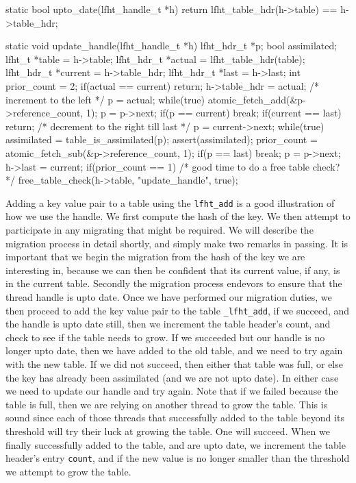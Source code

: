 \begin{center}
\begin{clisting}
static bool upto_date(lfht_handle_t *h){
  return lfht_table_hdr(h->table) == h->table_hdr;
}

static void update_handle(lfht_handle_t *h){
  lfht_hdr_t *p;
  bool assimilated;
  lfht_t *table = h->table;
  lfht_hdr_t *actual = lfht_table_hdr(table);
  lfht_hdr_t *current  = h->table_hdr;
  lfht_hdr_t *last = h->last;
  int prior_count = 2;
  if(actual == current){
    return;
  }
  h->table_hdr = actual;
  /* increment to the left */
  p = actual;
  while(true){
    atomic_fetch_add(&p->reference_count, 1);
    p = p->next;
    if(p == current){ break; }
  }
  if(current == last){  return; }
  /* decrement to the right till last */
  p = current->next;
  while(true){
    assimilated = table_is_assimilated(p);
    assert(assimilated);
    prior_count = atomic_fetch_sub(&p->reference_count, 1);
    if(p == last){ break; }
    p = p->next;
  }
  h->last = current;
  if(prior_count == 1){
    /* good time to do a free table check? */
    free_table_check(h->table, "update_handle", true);
  }
}
\end{clisting}
\end{center}

Adding a key value pair to a table using the \texttt{lfht\_add} is a good illustration of
how we use the handle. We first compute the hash of the key. We then attempt to participate in any
migrating that might be required. We will describe the migration process in detail shortly, and
simply make two remarks in passing. It is important that we begin the migration from the hash of the
key we are interesting in, because we can then be confident that its current value, if any, is in
the current table. Secondly the migration process endevors to ensure that the thread handle is upto date.
Once we have performed our migration duties, we then proceed to add the key value pair to the
table \texttt{\_lfht\_add}, if we succeed, and the handle is upto date still, then we increment
the table header's count, and check to see if the table needs to grow.
If we succeeded but our handle is no longer upto date, then we have added to the old table,
and we need to try again with the new table. If we did not succeed, then either that table
was full, or else the key has already been assimilated (and we are not  upto date). In either case
we need to update our handle and try again. Note that if we failed because the table is full, then
we are relying on another thread to grow the table. This is sound since each of those threads that
successfully added to the table beyond its threshold will try their luck at growing the table. One will
succeed. When we finally successfully added to the table, and are upto date, we increment the
table header's entry \texttt{count}, and if the new value is no longer smaller than the threshold
we attempt to grow the table.




